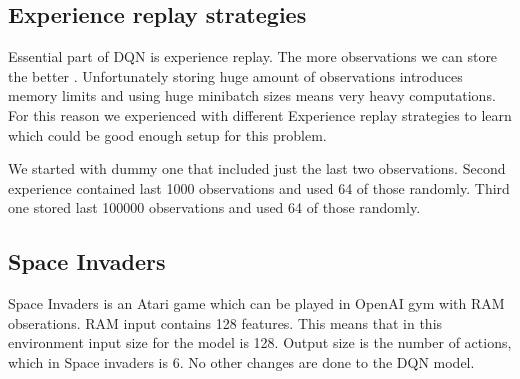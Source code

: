 \subsection{Experience replay strategies}
Essential part of DQN is experience replay. The more observations we can store the better \cite{mnih2015human}. Unfortunately storing huge amount of observations introduces memory limits and using huge minibatch sizes means very heavy computations. For this reason we experienced with different Experience replay strategies to learn which could be good enough setup for this problem.

We started with dummy one that included just the last two observations. Second experience contained last 1000 observations and used 64 of those randomly. Third one stored last 100000 observations and used 64 of those randomly.

\subsection{Space Invaders}
Space Invaders is an Atari game which can be played in OpenAI gym with RAM obserations. RAM input contains 128 features. This means that in this environment input size for the model is 128. Output size is the number of actions, which in Space invaders is 6. No other changes are done to the DQN model.